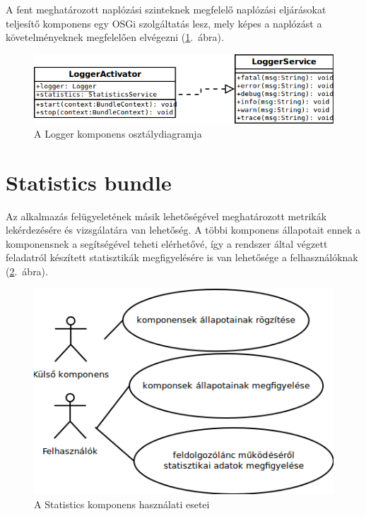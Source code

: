 A fent meghatározott naplózási szinteknek megfelelő naplózási eljárásokat teljesítő komponens egy OSGi szolgáltatás lesz, mely képes a naplózást a követelményeknek megfelelően elvégezni (\ref{fig:class_logger}.~ábra).

\begin{figure}[htp]
\centering
\includegraphics[scale=0.5]{img/class_logger}
\caption{A Logger komponens osztálydiagramja}
\label{fig:class_logger}
\end{figure}



\section{Statistics bundle}
\label{sec:statisticsbundle}

Az alkalmazás felügyeletének másik lehetőségével meghatározott metrikák lekérdezésére és vizsgálatára van lehetőség. A többi komponens állapotait ennek a komponensnek a segítségével teheti elérhetővé, így a rendszer által végzett feladatról készített statisztikák megfigyelésére is van lehetősége a felhasználóknak (\ref{fig:usecase_statistics}.~ábra).

\begin{figure}[htp]
\centering
\includegraphics[scale=0.5]{img/usecase_statistics}
\caption{A Statistics komponens használati esetei}
\label{fig:usecase_statistics}
\end{figure} 

